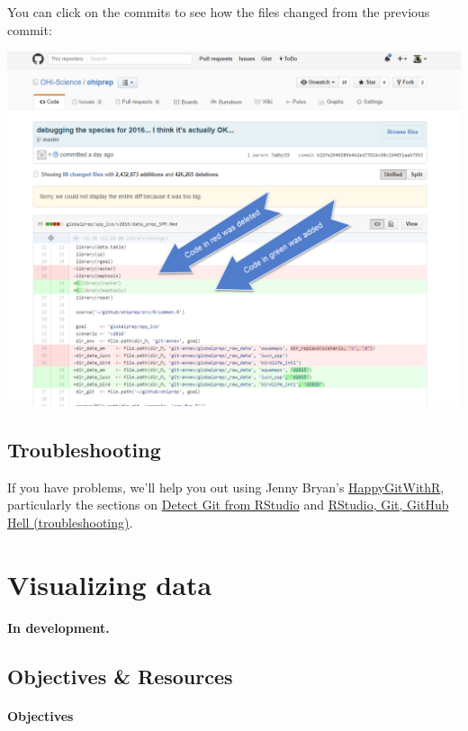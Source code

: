 \documentclass[]{book}
\theoremstyle{definition}
\theoremstyle{definition}
\theoremstyle{definition}
\theoremstyle{remark}
\begin{document}
You can click on the commits to see how the files changed from the
previous commit:

\includegraphics{img/commit_compare_3.png}

\section{Troubleshooting}\label{troubleshooting-1}

If you have problems, we'll help you out using Jenny Bryan's
\href{http://happygitwithr.com}{HappyGitWithR}, particularly the
sections on \href{http://happygitwithr.com/rstudio-see-git.html}{Detect
Git from RStudio} and
\href{http://happygitwithr.com/troubleshooting.html}{RStudio, Git,
GitHub Hell (troubleshooting)}.

\chapter{Visualizing data}\label{viz}

\textbf{In development.}

\section{Objectives \& Resources}\label{objectives-resources-1}

\subsubsection{Objectives}\label{objectives-1}
\end{document}
